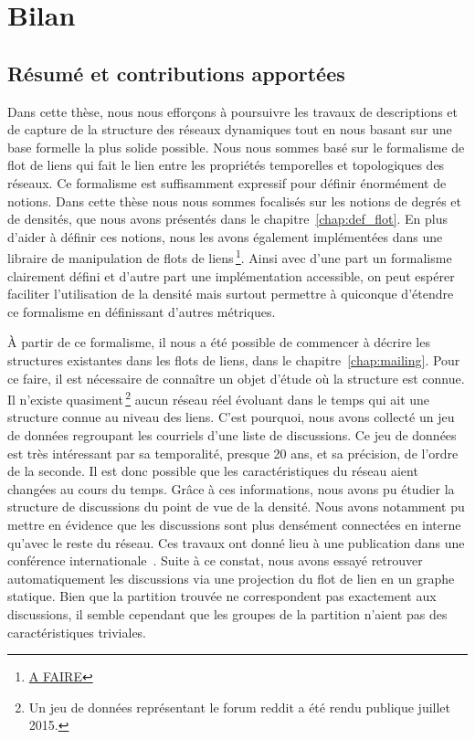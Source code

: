 \chapter{Bilan}
\label{Conclusion}

\section{Résumé et contributions apportées}

Dans cette thèse, nous nous efforçons à poursuivre les travaux de descriptions et de capture de la structure des réseaux dynamiques tout en nous basant sur une base formelle la plus solide possible.
Nous nous sommes basé sur le formalisme de flot de liens qui fait le lien entre les propriétés temporelles et topologiques des réseaux.
Ce formalisme est suffisamment expressif pour définir énormément de notions.
Dans cette thèse nous nous sommes focalisés sur les notions de degrés et de densités, que nous avons présentés dans le chapitre~\ref{chap:def_flot}.
En plus d'aider à définir ces notions, nous les avons également implémentées dans une libraire de manipulation de flots de liens\,\footnote{\url{A FAIRE}}.
Ainsi avec d'une part un formalisme clairement défini et d'autre part une implémentation accessible, on peut espérer faciliter l'utilisation de la densité mais surtout permettre à quiconque d'étendre ce formalisme en définissant d'autres métriques.

\`A partir de ce formalisme, il nous a été possible de commencer à décrire les structures existantes dans les flots de liens, dans le chapitre~\ref{chap:mailing}.
Pour ce faire, il est nécessaire de connaître un objet d'étude où la structure est connue.
Il n'existe quasiment\,\footnote{Un jeu de données représentant le forum reddit a été rendu publique juillet 2015.} aucun réseau réel évoluant dans le temps qui ait une structure connue au niveau des liens.
C'est pourquoi, nous avons collecté un jeu de données regroupant les courriels d'une liste de discussions.
Ce jeu de données est très intéressant par sa temporalité, presque 20 ans, et sa précision, de l'ordre de la seconde.
Il est donc possible que les caractéristiques du réseau aient changées au cours du temps.
Grâce à ces informations, nous avons pu étudier la structure de discussions du point de vue de la densité.
Nous avons notamment pu mettre en évidence que les discussions sont plus densément connectées en interne qu'avec le reste du réseau.
Ces travaux ont donné lieu à une publication dans une conférence internationale~\cite{Gaumont2016}.
Suite à ce constat, nous avons essayé retrouver automatiquement les discussions via une projection du flot de lien en un graphe statique.
Bien que la partition trouvée ne correspondent pas exactement aux discussions, il semble cependant que les groupes de la partition n'aient pas des caractéristiques triviales.


